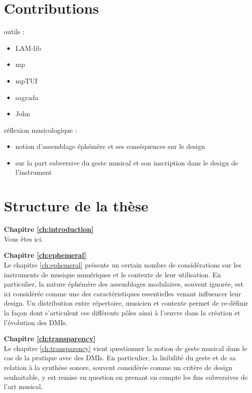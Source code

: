 \section{Contributions}

outils :
\vspace{-1em}
\begin{itemize}[noitemsep]
\item LAM-lib
\item mp
\item mpTUI
\item sagrada
\item John
\end{itemize}


réflexion musicologique : 
\vspace{-1em}
\begin{itemize}[noitemsep]
\item notion d'assemblage éphémère et ses conséquences sur le design
\item sur la part subversive du geste musical et son inscription dans le design de l'instrument
\end{itemize}



\section{Structure de la thèse}
\label{sec:preamble:structure}

\textbf{Chapitre \ref{ch:introduction}} \\[0.2em]
Vous êtes ici.

\textbf{Chapitre \ref{ch:ephemeral}} \\[0.2em]
Le chapitre \ref{ch:ephemeral} présente un certain nombre de considérations sur les instruments de musique numériques et le contexte de leur utilisation. En particulier, la nature éphémère des assemblages modulaires, souvent ignorée, est ici considérée comme une des caractéristiques essentielles venant influencer leur design. Un distribution entre répertoire, musicien et contexte permet de re-définir la façon dont s'articulent ces différents pôles ainsi à l'œuvre dans la création et l'évolution des DMIs.

\textbf{Chapitre \ref{ch:transparency}} \\[0.2em]
Le chapitre \ref{ch:transparency} vient questionner la notion de geste musical dans le cas de la pratique avec des DMIs. En particulier, la lisibilité du geste et de sa relation à la synthèse sonore, souvent considérée comme un critère de design souhaitable, y est remise en question en prenant en compte les fins subversives de l'art musical. 

